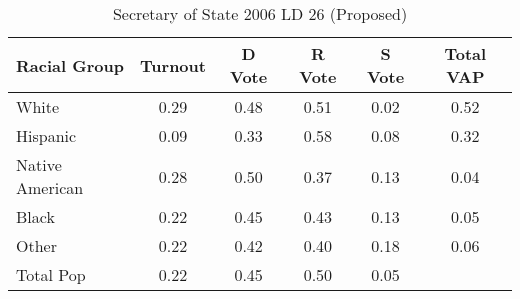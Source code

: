 \begin{table}[htb]
\begin{center}
\caption{Secretary of State 2006 LD 26 (Proposed)}
\label{sos06_vap_ld_26}
\begin{tabular}{lccccc}
  \hline
Racial Group & Turnout & D Vote & R Vote & S Vote & Total VAP \\ 
  \hline
White & 0.29 & 0.48 & 0.51 & 0.02 & 0.52 \\ 
  Hispanic & 0.09 & 0.33 & 0.58 & 0.08 & 0.32 \\ 
  Native American & 0.28 & 0.50 & 0.37 & 0.13 & 0.04 \\ 
  Black & 0.22 & 0.45 & 0.43 & 0.13 & 0.05 \\ 
  Other & 0.22 & 0.42 & 0.40 & 0.18 & 0.06 \\ 
  Total Pop & 0.22 & 0.45 & 0.50 & 0.05 &  \\ 
   \hline
\end{tabular}
\end{center}
\end{table}
